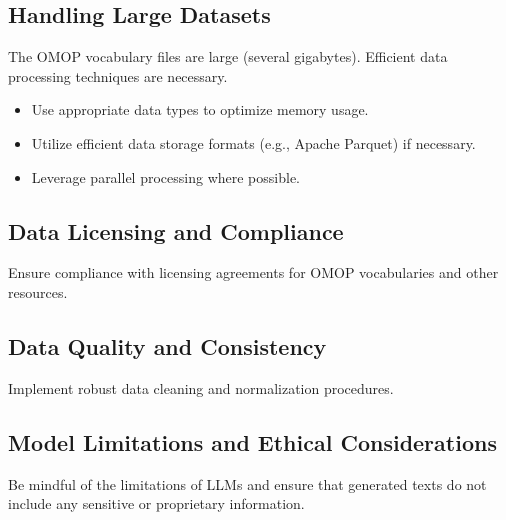 \documentclass[12pt, a4paper]{article}
\begin{document}
\subsection{Handling Large Datasets}

The OMOP vocabulary files are large (several gigabytes). Efficient data processing techniques are necessary.

\begin{itemize}
    \item Use appropriate data types to optimize memory usage.
    \item Utilize efficient data storage formats (e.g., Apache Parquet) if necessary.
    \item Leverage parallel processing where possible.
\end{itemize}

\subsection{Data Licensing and Compliance}

Ensure compliance with licensing agreements for OMOP vocabularies and other resources.

\subsection{Data Quality and Consistency}

Implement robust data cleaning and normalization procedures.

\subsection{Model Limitations and Ethical Considerations}

Be mindful of the limitations of LLMs and ensure that generated texts do not include any sensitive or proprietary information.
\end{document}
